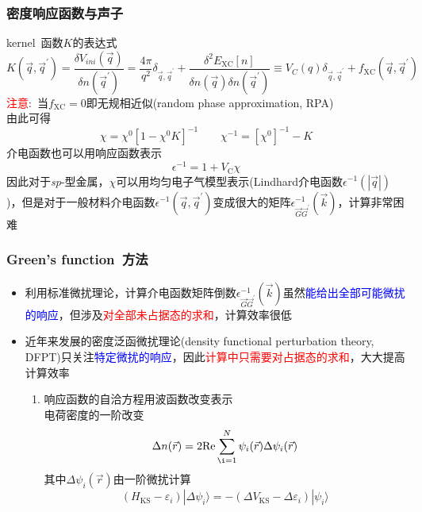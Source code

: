 \documentclass[cjk,slidestop,compress,mathserif,blue]{beamer}
\begin{document}
\frame
{
	\frametitle{密度响应函数与声子}
	\textrm{kernel~}函数$K$的表达式
	\begin{displaymath}
		K(\vec q,\vec q^{\prime})=\frac{\delta V_{ini}(\vec q)}{\delta n(\vec q^{\prime})}=\frac{4\pi}{q^2}\delta_{\vec q,\vec q^{\prime}}+\frac{\delta^2 E_{\mathrm{XC}}[n]}{\delta n(\vec q)\delta n(\vec q^{\prime})}\equiv V_C(q)\delta_{\vec q,\vec q^{\prime}}+f_{\mathrm{XC}}(\vec q,\vec q^{\prime})
	\end{displaymath}
	\textcolor{red}{注意}:~当$f_\mathrm{XC}=0$即无规相近似(\textrm{random phase approximation, RPA})\\
	由此可得
	\begin{displaymath}
		\chi=\chi^0[1-\chi^0K]^{-1}\qquad\chi^{-1}=[\chi^0]^{-1}-K
	\end{displaymath}
介电函数也可以用响应函数表示
	\begin{displaymath}
		\epsilon^{-1}=1+V_\mathrm{C}\chi
	\end{displaymath}
	因此对于\textit{sp}-型金属，$\chi$可以用均匀电子气模型表示(\textrm{Lindhard}介电函数$\epsilon^{-1}(|\vec q|)$)，但是对于一般材料介电函数$\epsilon^{-1}(\vec q,\vec q^{\prime})$变成很大的矩阵$\epsilon_{\vec G\vec G^{\prime}}^{-1}(\vec k)$，计算非常困难
}

\frame
{
	\frametitle{\textrm{Green's function~}方法}
	\begin{itemize}
		\item 利用标准微扰理论，计算介电函数矩阵倒数$\epsilon_{\vec G\vec G^{\prime}}^{-1}(\vec k)$虽然\textcolor{blue}{能给出全部可能微扰的响应}，但涉及\textcolor{red}{对全部未占据态的求和}，计算效率很低
		\item 近年来发展的密度泛函微扰理论\textrm{(density functional perturbation theory, DFPT)}只关注\textcolor{blue}{特定微扰的响应}，因此\textcolor{red}{计算中只需要对占据态的求和}，大大提高计算效率
			\begin{enumerate}
				\item 响应函数的自洽方程用波函数改变表示\\
					电荷密度的一阶改变
					\begin{displaymath}
						\Delta n(\vec r)=2\mathrm{Re}\sum_{\i=1}^N\psi_i(\vec r)\Delta\psi_i(\vec r)
					\end{displaymath}
					其中$\Delta\psi_i(\vec r)$由一阶微扰计算
					\begin{displaymath}
						(H_{\mathrm{KS}}-\varepsilon_i)|\Delta\psi_i\rangle=-(\Delta V_{\mathrm{KS}}-\Delta\varepsilon_i)|\psi_i\rangle
					\end{displaymath}
			\end{enumerate}
	\end{itemize}
}
\end{document}

